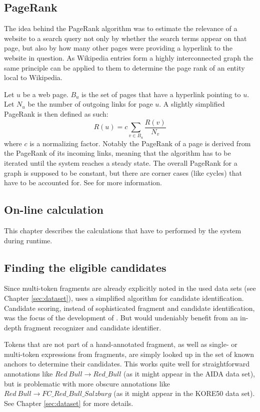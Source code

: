 \documentclass[runningheads,a4paper]{llncs}
\begin{document}
{\subsection{PageRank}\label{sec:pagerank}
The idea behind the PageRank algorithm was to estimate the relevance of a website to a search query not only by whether the search terms appear on that page, but also by how many other pages were providing a hyperlink to the website in question. As Wikipedia entries form a highly interconnected graph the same principle can be applied to them to determine the page rank of an entity local to Wikipedia.

Let $u$ be a web page. $B_u$ is the set of pages that have a hyperlink pointing to $u$. Let $N_u$ be the number of outgoing links for page $u$. A slightly simplified PageRank is then defined as such: 
$$R(u) = c \sum_{v \in B_u} \frac{R(v)}{N_v}$$
where $c$ is a normalizing factor. Notably the PageRank of a page is derived from the PageRank of its incoming links, meaning that the algorithm has to be iterated until the system reaches a steady state. The overall PageRank for a graph is supposed to be constant, but there are corner cases (like cycles) that have to be accounted for. See \cite{pageRank} for more information.

\subsection{On-line calculation}

This chapter describes the calculations that have to performed by the system during runtime.

\subsection{Finding the eligible candidates}
Since multi-token fragments are already explicitly noted in the used data sets (see Chapter \ref{sec:dataset}), {\acronym} uses a simplified algorithm for candidate identification. Candidate scoring, instead of sophisticated fragment and candidate identification, was the focus of the development of {\acronym}. But {\acronym} would undeniably benefit from an in-depth fragment recognizer and candidate identifier.

Tokens that are not part of a hand-annotated fragment, as well as single- or multi-token expressions from fragments, are simply looked up in the set of known anchors to determine their candidates. This works quite well for straightforward annotations like $Red\ Bull \rightarrow Red\_Bull$ (as it might appear in the AIDA data set), but is problematic with more obscure annotations like $Red\ Bull \rightarrow FC\_Red\_Bull\_Salzburg$ (as it might appear in the KORE50 data set). See Chapter \ref{sec:dataset} for more details.

}
\end{document}
